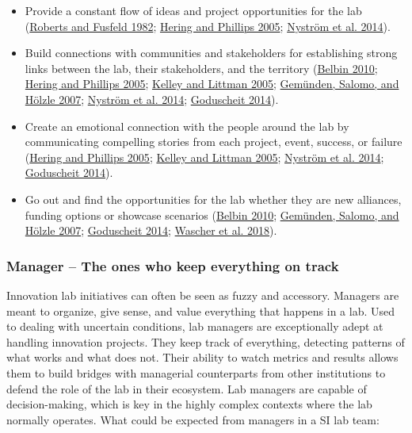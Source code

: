 \documentclass[AMA,STIX1COL,APA,STIX2COL]{WileyNJD-v2}
\providecommand{\tightlist}{%
  \setlength{\itemsep}{0pt}\setlength{\parskip}{0pt}}
\begin{document}
\begin{itemize}
\tightlist
\item
  Provide a constant flow of ideas and project opportunities for the lab
  (\protect\hyperlink{ref-Roberts1982}{Roberts and Fusfeld 1982};
  \protect\hyperlink{ref-Hering2005}{Hering and Phillips 2005};
  \protect\hyperlink{ref-Nystrom2014}{Nyström et al. 2014}).
\item
  Build connections with communities and stakeholders for establishing
  strong links between the lab, their stakeholders, and the territory
  (\protect\hyperlink{ref-Belbin2010}{Belbin 2010};
  \protect\hyperlink{ref-Hering2005}{Hering and Phillips 2005};
  \protect\hyperlink{ref-Kelley2005}{Kelley and Littman 2005};
  \protect\hyperlink{ref-Gemunden2007}{Gemünden, Salomo, and Hölzle
  2007}; \protect\hyperlink{ref-Nystrom2014}{Nyström et al. 2014};
  \protect\hyperlink{ref-Goduscheit2014}{Goduscheit 2014}).
\item
  Create an emotional connection with the people around the lab by
  communicating compelling stories from each project, event, success, or
  failure (\protect\hyperlink{ref-Hering2005}{Hering and Phillips 2005};
  \protect\hyperlink{ref-Kelley2005}{Kelley and Littman 2005};
  \protect\hyperlink{ref-Nystrom2014}{Nyström et al. 2014};
  \protect\hyperlink{ref-Goduscheit2014}{Goduscheit 2014}).
\item
  Go out and find the opportunities for the lab whether they are new
  alliances, funding options or showcase scenarios
  (\protect\hyperlink{ref-Belbin2010}{Belbin 2010};
  \protect\hyperlink{ref-Gemunden2007}{Gemünden, Salomo, and Hölzle
  2007}; \protect\hyperlink{ref-Goduscheit2014}{Goduscheit 2014};
  \protect\hyperlink{ref-Wascher2018}{Wascher et al. 2018}).
\end{itemize}

\hypertarget{manager-the-ones-who-keep-everything-on-track}{%
\subsubsection{Manager -- The ones who keep everything on
track}\label{manager-the-ones-who-keep-everything-on-track}}

Innovation lab initiatives can often be seen as fuzzy and accessory.
Managers are meant to organize, give sense, and value everything that
happens in a lab. Used to dealing with uncertain conditions, lab
managers are exceptionally adept at handling innovation projects. They
keep track of everything, detecting patterns of what works and what does
not. Their ability to watch metrics and results allows them to build
bridges with managerial counterparts from other institutions to defend
the role of the lab in their ecosystem. Lab managers are capable of
decision-making, which is key in the highly complex contexts where the
lab normally operates. What could be expected from managers in a SI lab
team:
\end{document}
